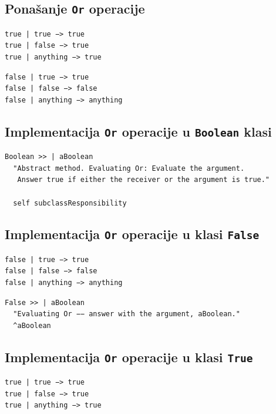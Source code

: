 \documentclass[presentation]{beamer}
\begin{document}
\subsection{Ponašanje \texttt{Or} operacije}
\label{sec:org7a7f6da}

\begin{verbatim}
true | true −> true
true | false −> true
true | anything −> true
\end{verbatim}

\begin{verbatim}
false | true −> true
false | false −> false
false | anything −> anything
\end{verbatim}

\subsection{Implementacija \texttt{Or} operacije u \texttt{Boolean} klasi}
\label{sec:org4904673}

\begin{verbatim}
Boolean >> | aBoolean
  "Abstract method. Evaluating Or: Evaluate the argument.
   Answer true if either the receiver or the argument is true."

  self subclassResponsibility
\end{verbatim}

\subsection{Implementacija \texttt{Or} operacije u klasi \texttt{False}}
\label{sec:org29b1c8e}

\begin{verbatim}
false | true −> true
false | false −> false
false | anything −> anything
\end{verbatim}

\begin{verbatim}
False >> | aBoolean
  "Evaluating Or −− answer with the argument, aBoolean."
  ^aBoolean
\end{verbatim}

\subsection{Implementacija \texttt{Or} operacije u klasi \texttt{True}}
\label{sec:org54796ea}

\begin{verbatim}
true | true −> true
true | false −> true
true | anything −> true
\end{verbatim}
\end{document}
